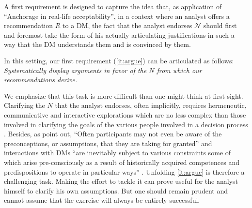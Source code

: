 \documentclass[preprint, french, english, 11pt, authoryear]{elsarticle}%
\newcommand{\adv}{\mathscr{N}}
\begin{document}
A first requirement is designed to capture the idea that, as application of “Anchorage in real-life acceptability”, in a context where an analyst offers a recommendation $R$ to a \ac{DM}, 
the fact that the analyst endorses $\adv$ should first and foremost take the form of his actually articulating justifications in such a way that the \ac{DM} understands them and is convinced by them.


In this setting, our first requirement (\cref{it:argue}) can be articulated as follows: \emph{Systematically display arguments in favor of the $N$ from which our recommendations derive.}

We emphasize that this task is more difficult than one might think at first sight.
Clarifying the $N$ that the analyst endorses, often implicitly, requires hermeneutic, communicative and interactive explorations which are no less complex than those involved in clarifying the goals of the various people involved in a decision process \citep{reisach_creation_2016}.
Besides, as \citet{cronin_issues_2014} point out, ``Often participants may not even be aware of the preconceptions, or assumptions, that they are taking for granted'' and interactions with \acp{DM} 
``are inevitably subject to various constraints some of which arise pre-consciously as a result of historically acquired competences and predispositions to operate in particular ways'' \citep{brocklesby_ethics_2009}.
Unfolding \cref{it:argue} is therefore a challenging task. Making the effort to tackle it can prove useful for the analyst himself to clarify his own assumptions. But one should remain prudent and cannot assume that the exercise will always be entirely successful.
\end{document}
